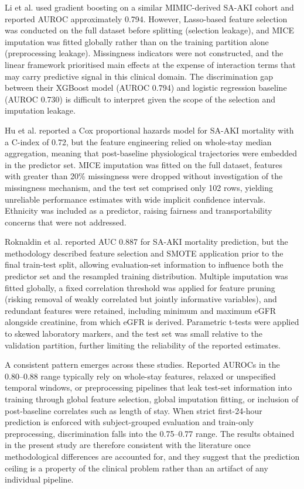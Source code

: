 Li et al.\cite{Li2023} used gradient boosting on a similar MIMIC-derived SA-AKI cohort and reported AUROC approximately 0.794. However, Lasso-based feature selection was conducted on the full dataset before splitting (selection leakage), and MICE imputation was fitted globally rather than on the training partition alone (preprocessing leakage). Missingness indicators were not constructed, and the linear framework prioritised main effects at the expense of interaction terms that may carry predictive signal in this clinical domain. The discrimination gap between their XGBoost model (AUROC 0.794) and logistic regression baseline (AUROC 0.730) is difficult to interpret given the scope of the selection and imputation leakage.

Hu et al.\cite{Hu2021} reported a Cox proportional hazards model for SA-AKI mortality with a C-index of 0.72, but the feature engineering relied on whole-stay median aggregation, meaning that post-baseline physiological trajectories were embedded in the predictor set. MICE imputation was fitted on the full dataset, features with greater than 20\% missingness were dropped without investigation of the missingness mechanism, and the test set comprised only 102 rows, yielding unreliable performance estimates with wide implicit confidence intervals. Ethnicity was included as a predictor, raising fairness and transportability concerns that were not addressed.

Roknaldin et al.\cite{Roknaldin2024} reported AUC 0.887 for SA-AKI mortality prediction, but the methodology described feature selection and SMOTE application prior to the final train-test split, allowing evaluation-set information to influence both the predictor set and the resampled training distribution. Multiple imputation was fitted globally, a fixed correlation threshold was applied for feature pruning (risking removal of weakly correlated but jointly informative variables), and redundant features were retained, including minimum and maximum eGFR alongside creatinine, from which eGFR is derived. Parametric t-tests were applied to skewed laboratory markers, and the test set was small relative to the validation partition, further limiting the reliability of the reported estimates.

A consistent pattern emerges across these studies. Reported AUROCs in the 0.80--0.88 range typically rely on whole-stay features, relaxed or unspecified temporal windows, or preprocessing pipelines that leak test-set information into training through global feature selection, global imputation fitting, or inclusion of post-baseline correlates such as length of stay. When strict first-24-hour prediction is enforced with subject-grouped evaluation and train-only preprocessing, discrimination falls into the 0.75--0.77 range. The results obtained in the present study are therefore consistent with the literature once methodological differences are accounted for, and they suggest that the prediction ceiling is a property of the clinical problem rather than an artifact of any individual pipeline.

